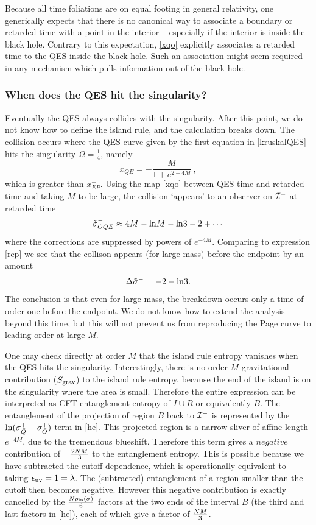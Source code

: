 \documentclass[12pt,oneside,letterpaper]{article}
\newcommand{\be}{\begin{equation}}
\newcommand{\ee}{\end{equation}}
\def\be{\begin{eqnarray}}
\def\ee{\end{eqnarray}}
\let\s=\sigma \let\t=\tau \let\u=\upsilon \let\c=\chi
\def\be{\begin{equation}}
\def\ee{\end{equation}}
\def\m{{M}}
\def\euv{\epsilon_{\rm uv}}
\def\log{{\rm ln}}
\numberwithin{equation}{section}
\def \be {\begin{equation}}
\def \ee {\end{equation}}
\begin{document}
Because all time foliations are on equal footing in general relativity, one generically expects that there is no canonical way to associate a boundary or retarded time with a point in the interior  --  especially if the interior is inside the black hole.  Contrary to this expectation, \eqref{xqo} explicitly associates a retarded time to the QES inside the black hole. Such an association might  seem required in any mechanism which pulls information out of the black hole. 







\subsubsection{When does the QES hit the singularity?}

Eventually the QES always collides with  the singularity. After this point, we do not know how to define the island rule, and the calculation breaks down. The collision  occurs where the QES curve given by the first equation in \eqref{kruskalQES} hits the singularity $\Omega = \frac{1}{4}$, namely
\be
x^-_{QE} = - \frac{\m }{1 + e^{2-4\m }} \ ,
\ee
which is greater than $x^-_{EP}$.
Using the  map \eqref{xqo} between QES time and retarded time and taking $\m$ to be large, the collision `appears' to an observer on ${\cal I}^+$
at retarded time 
\be
\tilde\s_{OQE}^- \approx 
4\m-\log \m -\log 3 -2 +\cdots
\ee 
where the corrections are suppressed by powers of $e^{-4\m}$. Comparing to expression \eqref{rep} we see that the collison appears (for large mass) before 
 the endpoint by an amount
 \be \Delta \tilde \s^-=-2-\log 3. \ee
 The conclusion is that even for large mass, the breakdown occurs only a time of order one before the endpoint. We do not know how to extend the analysis beyond this time, but this will not prevent us from reproducing the Page curve to leading order at large $\m$.
 
 
 
 
 One may check directly at order $\m$ that the island rule entropy vanishes when the QES hits the singularity.  Interestingly, there is no order $\m$ gravitational contribution ($S_{\rm grav}$) to the island rule entropy, because the end of the island is on the singularity where the area is small.  Therefore the entire expression can be interpreted as CFT entanglement entropy of $I\cup R$ or equivalently $B$. The entanglement of the projection of region $B$ back to ${\cal I}^-$ is represented by the $\log (\s^+_{\bar Q}  - \s^+_{\bar O})$ term in \eqref{he}. This projected region is a narrow sliver of affine length $e^{-4M}$, due to the tremendous blueshift. Therefore this term gives a $negative$ contribution of $-{2N\m \over 3}$ to the entanglement entropy. This is possible because we have subtracted the cutoff dependence, which is operationally equivalent to taking $\euv=1=\lambda$. The (subtracted) entanglement of a region smaller than the cutoff then becomes negative. However this negative contribution is exactly cancelled by the $N\rho_{\text{in}}(\s) \over 6 $ factors at the two ends of the interval $B$ (the third and last factors in \eqref{he}), each of which give a factor of $N\m \over 3$. 
 
\end{document}
